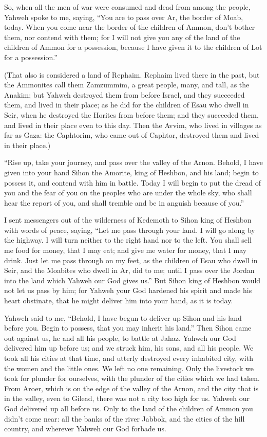 {So, when all the men of war were consumed and dead from among the people,
Yahweh spoke to me, saying,
“You are to pass over Ar, the border of Moab, today.
When you come near the border of the children of Ammon, don’t bother them, nor contend with them; for I will not give you any of the land of the children of Ammon for a possession, because I have given it to the children of Lot for a possession.”
\par }{\PP {}(That also is considered a land of Rephaim. Rephaim lived there in the past, but the Ammonites call them Zamzummim,
a great people, many, and tall, as the Anakim; but Yahweh destroyed them from before Israel, and they succeeded them, and lived in their place;
as he did for the children of Esau who dwell in Seir, when he destroyed the Horites from before them; and they succeeded them, and lived in their place even to this day.
Then the Avvim, who lived in villages as far as Gaza: the Caphtorim, who came out of Caphtor, destroyed them and lived in their place.)
\par }{\PP {}“Rise up, take your journey, and pass over the valley of the Arnon. Behold, I have given into your hand Sihon the Amorite, king of Heshbon, and his land; begin to possess it, and contend with him in battle.
Today I will begin to put the dread of you and the fear of you on the peoples who are under the whole sky, who shall hear the report of you, and shall tremble and be in anguish because of you.”
\par }{\PP {}I sent messengers out of the wilderness of Kedemoth to Sihon king of Heshbon with words of peace, saying,
“Let me pass through your land. I will go along by the highway. I will turn neither to the right hand nor to the left.
You shall sell me food for money, that I may eat; and give me water for money, that I may drink. Just let me pass through on my feet,
as the children of Esau who dwell in Seir, and the Moabites who dwell in Ar, did to me; until I pass over the Jordan into the land which Yahweh our God gives us.”
But Sihon king of Heshbon would not let us pass by him; for Yahweh your God hardened his spirit and made his heart obstinate, that he might deliver him into your hand, as it is today.
\par }{\PP {}Yahweh said to me, “Behold, I have begun to deliver up Sihon and his land before you. Begin to possess, that you may inherit his land.”
Then Sihon came out against us, he and all his people, to battle at Jahaz.
Yahweh our God delivered him up before us; and we struck him, his sons, and all his people.
We took all his cities at that time, and utterly destroyed every inhabited city, with the women and the little ones. We left no one remaining.
Only the livestock we took for plunder for ourselves, with the plunder of the cities which we had taken.
From Aroer, which is on the edge of the valley of the Arnon, and the city that is in the valley, even to Gilead, there was not a city too high for us. Yahweh our God delivered up all before us.
Only to the land of the children of Ammon you didn’t come near: all the banks of the river Jabbok, and the cities of the hill country, and wherever Yahweh our God forbade us.

}
